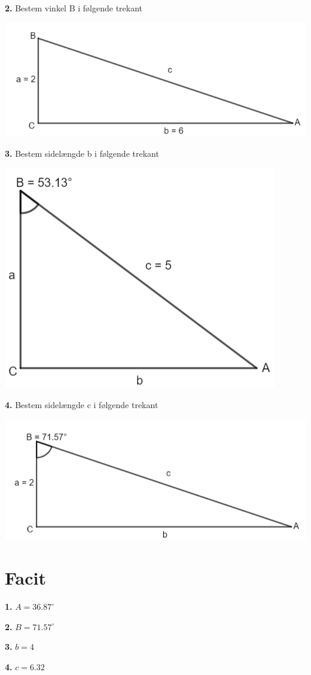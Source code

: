 \textbf{2.}
Bestem vinkel B i følgende trekant

\includegraphics[scale=0.7]{img_5}

\textbf{3.}
Bestem sidelængde b i følgende trekant

\includegraphics[scale=0.7]{img_4}

\textbf{4.}
Bestem sidelængde c i følgende trekant

\includegraphics[scale=0.7]{img_6}


\newpage

\section*{Facit}

\textbf{1.} $A = 36.87^{\circ}$

\textbf{2.} $B = 71.57^{\circ}$

\textbf{3.} $b = 4$

\textbf{4.} $c = 6.32$